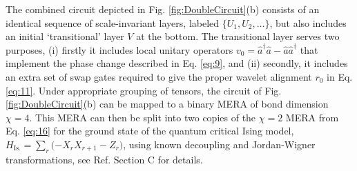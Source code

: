 \documentclass[aps,prl,twocolumn,showpacs,superscriptaddress,floatfix,10pt]{revtex4-1}
\begin{document}
The combined circuit depicted in Fig. \ref{fig:DoubleCircuit}(b) consists of an identical sequence of scale-invariant layers, labeled $\{U_1,U_2,\ldots \}$, but also includes an initial `transitional' layer $V$ at the bottom. The transitional layer serves two purposes, (i) firstly it includes local unitary operators $v_0 = \hat a^\dag \hat a - \hat a \hat a^\dag$ that implement the phase change described in Eq. \ref{eq:9}, and (ii) secondly, it includes an
extra set of swap gates required to give the proper wavelet alignment $r_0$ in Eq. \ref{eq:11}. Under appropriate grouping of tensors, the circuit of Fig. \ref{fig:DoubleCircuit}(b) can be mapped to a binary MERA of bond dimension $\chi=4$. This MERA can then be split into two copies of the $\chi=2$ MERA from  Eq. \ref{eq:16} for the ground state of the quantum critical Ising model, $H_\textrm{Is.} = \sum\nolimits_r {( - {X_r} {X_{r + 1}} - {Z_r}} )$, using known decoupling \cite{Decouple} and Jordan-Wigner \cite{GroundEnt} transformations, see Ref.\cite{Supp} Section C for details.

\end{document}
